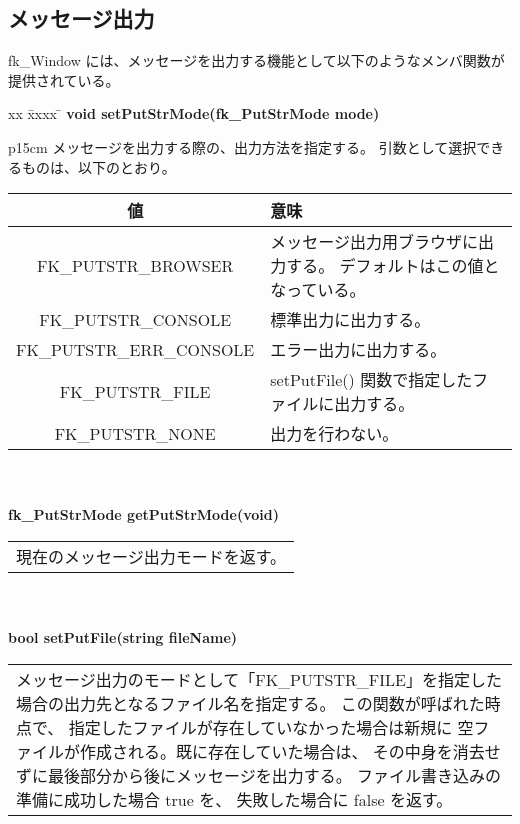 \subsection{メッセージ出力} \label{subsec:winmessage}
fk\_Window には、メッセージを出力する機能として以下のようなメンバ関数が
提供されている。
\begin{tabbing}
xx \= xxxx \= \kill
\> \textbf{void setPutStrMode(fk\_PutStrMode mode)} \\
	\> \> \begin{tabular}{p{15cm}}
		メッセージを出力する際の、出力方法を指定する。
		引数として選択できるものは、以下のとおり。
		\begin{center}
		\begin{tabular}{|c|p{8cm}|}
		\hline
		値 & 意味 \\ \hline
		FK\_PUTSTR\_BROWSER &
			メッセージ出力用ブラウザに出力する。
			デフォルトはこの値となっている。\\ \hline
		FK\_PUTSTR\_CONSOLE &
			標準出力に出力する。\\ \hline
		FK\_PUTSTR\_ERR\_CONSOLE &
			エラー出力に出力する。\\ \hline
		FK\_PUTSTR\_FILE &
			setPutFile() 関数で指定したファイルに出力する。\\ \hline
		FK\_PUTSTR\_NONE &
			出力を行わない。\\ \hline
		\end{tabular}
		\end{center}
	\end{tabular} \\ \\
\> \textbf{fk\_PutStrMode getPutStrMode(void)} \\
	\> \> \begin{tabular}{p{15cm}}
		現在のメッセージ出力モードを返す。
	\end{tabular} \\ \\

\> \textbf{bool setPutFile(string fileName)} \\
	\> \> \begin{tabular}{p{15cm}}
		メッセージ出力のモードとして「FK\_PUTSTR\_FILE」を指定した
		場合の出力先となるファイル名を指定する。
		この関数が呼ばれた時点で、
		指定したファイルが存在していなかった場合は新規に
		空ファイルが作成される。既に存在していた場合は、
		その中身を消去せずに最後部分から後にメッセージを出力する。
		ファイル書き込みの準備に成功した場合 true を、
		失敗した場合に false を返す。
	\end{tabular} \\ \\


\end{tabbing}
